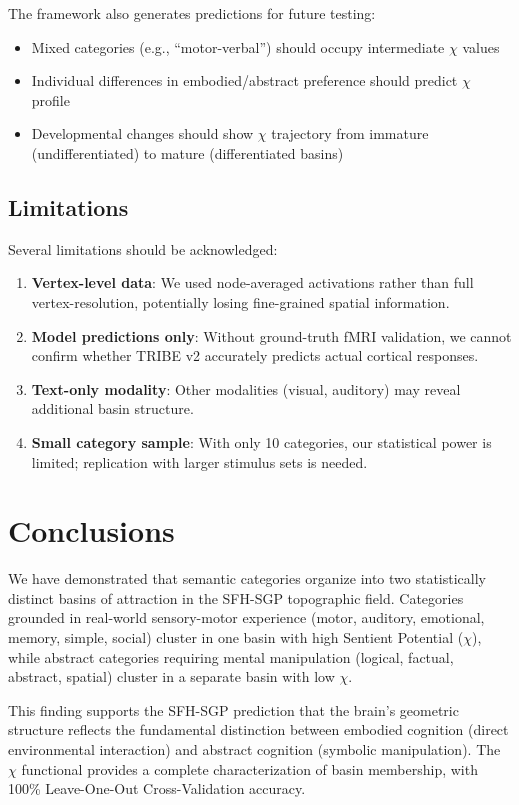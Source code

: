 \documentclass[12pt]{article}
\numberwithin{equation}{section}
\begin{document}
The framework also generates predictions for future testing:
\begin{itemize}
	\item Mixed categories (e.g., ``motor-verbal'') should occupy intermediate $\chi$ values
	\item Individual differences in embodied/abstract preference should predict $\chi$ profile
	\item Developmental changes should show $\chi$ trajectory from immature (undifferentiated) to mature (differentiated basins)
\end{itemize}

\subsection{Limitations}

Several limitations should be acknowledged:

\begin{enumerate}
	\item \textbf{Vertex-level data}: We used node-averaged activations rather than full vertex-resolution, potentially losing fine-grained spatial information.
	\item \textbf{Model predictions only}: Without ground-truth fMRI validation, we cannot confirm whether TRIBE v2 accurately predicts actual cortical responses.
	\item \textbf{Text-only modality}: Other modalities (visual, auditory) may reveal additional basin structure.
	\item \textbf{Small category sample}: With only 10 categories, our statistical power is limited; replication with larger stimulus sets is needed.
\end{enumerate}

\section{Conclusions}

We have demonstrated that semantic categories organize into two statistically distinct basins of attraction in the SFH-SGP topographic field. Categories grounded in real-world sensory-motor experience (motor, auditory, emotional, memory, simple, social) cluster in one basin with high Sentient Potential ($\chi$), while abstract categories requiring mental manipulation (logical, factual, abstract, spatial) cluster in a separate basin with low $\chi$.

This finding supports the SFH-SGP prediction that the brain's geometric structure reflects the fundamental distinction between embodied cognition (direct environmental interaction) and abstract cognition (symbolic manipulation). The $\chi$ functional provides a complete characterization of basin membership, with 100\% Leave-One-Out Cross-Validation accuracy.
\end{document}
